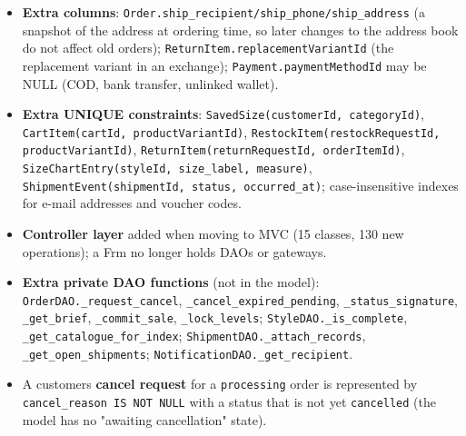 \begin{itemize}
\tightlist
\item
  \textbf{Extra columns}:
  \texttt{Order.\allowbreak{}ship\_\allowbreak{}recipient/\allowbreak{}ship\_\allowbreak{}phone/\allowbreak{}ship\_\allowbreak{}address} (a snapshot
  of the address at ordering time, so later changes to the address book
  do not affect old orders); \texttt{ReturnItem.\allowbreak{}replacementVariantId}
  (the replacement variant in an exchange);
  \texttt{Payment.\allowbreak{}paymentMethodId} may be NULL (COD, bank transfer,
  unlinked wallet).
\item
  \textbf{Extra UNIQUE constraints}:
  \texttt{SavedSize(\allowbreak{}customerId,\allowbreak{} categoryId)},
  \texttt{CartItem(\allowbreak{}cartId,\allowbreak{} productVariantId)},
  \texttt{RestockItem(\allowbreak{}restockRequestId,\allowbreak{} productVariantId)},
  \texttt{ReturnItem(\allowbreak{}returnRequestId,\allowbreak{} orderItemId)},
  \texttt{SizeChartEntry(\allowbreak{}styleId,\allowbreak{} size\_\allowbreak{}label,\allowbreak{} measure)},
  \texttt{ShipmentEvent(\allowbreak{}shipmentId,\allowbreak{} status,\allowbreak{} occurred\_\allowbreak{}at)};
  case-insensitive indexes for e-mail addresses and voucher codes.
\item
  \textbf{Controller layer} added when moving to MVC (15 classes, 130
  new operations); a Frm no longer holds DAOs or gateways.
\item
  \textbf{Extra private DAO functions} (not in the model):
  \texttt{OrderDAO.\allowbreak{}\_\allowbreak{}request\_\allowbreak{}cancel},
  \texttt{\_\allowbreak{}cancel\_\allowbreak{}expired\_\allowbreak{}pending}, \texttt{\_\allowbreak{}status\_\allowbreak{}signature},
  \texttt{\_\allowbreak{}get\_\allowbreak{}brief}, \texttt{\_\allowbreak{}commit\_\allowbreak{}sale},
  \texttt{\_\allowbreak{}lock\_\allowbreak{}levels}; \texttt{StyleDAO.\allowbreak{}\_\allowbreak{}is\_\allowbreak{}complete},
  \texttt{\_\allowbreak{}get\_\allowbreak{}catalogue\_\allowbreak{}for\_\allowbreak{}index};
  \texttt{ShipmentDAO.\allowbreak{}\_\allowbreak{}attach\_\allowbreak{}records},
  \texttt{\_\allowbreak{}get\_\allowbreak{}open\_\allowbreak{}shipments};
  \texttt{NotificationDAO.\allowbreak{}\_\allowbreak{}get\_\allowbreak{}recipient}.
\item
  A customer\textquotesingle s \textbf{cancel request} for a
  \texttt{processing} order is represented by
  \texttt{cancel\_\allowbreak{}reason IS NOT NULL} with a status that is not yet
  \texttt{cancelled} (the model has no "awaiting cancellation" state).

\end{itemize}
